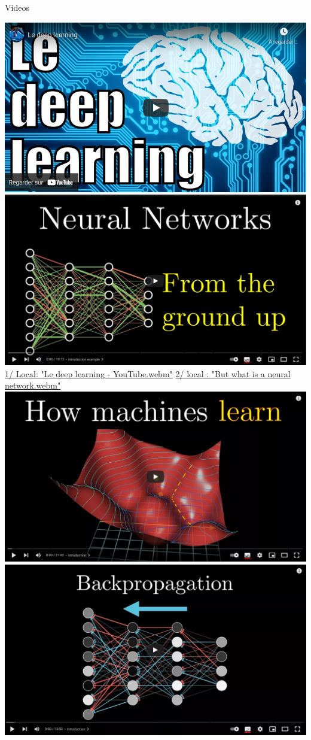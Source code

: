 \documentclass[11pt,serif,mathserif,compress,hyperref={colorlinks}]{beamer}
\begin{document}
\begin{frame}{Videos}

  \hspace*{-3mm}
  \href{https://youtu.be/trWrEWfhTVg}{\includegraphics[width=.5\textwidth]{images/video-LeDeepLearning.png}}
  \hfill%
  \href{https://www.3blue1brown.com/lessons/neural-networks}{\includegraphics[width=.5\textwidth]{images/video-NeuralNetworks.png}}\\[-2mm]

  {\tiny\hspace*{-2mm}\href{run:./videos/Le deep learning - YouTube.webm}{1/ Local: "Le deep learning - YouTube.webm"}%
    \hfill%
    \href{run:./videos/But what is a neural network.webm}{2/ local : "But what is a neural network.webm"}}\\[2mm]
            
  \hspace*{-3mm}
  \href{https://www.3blue1brown.com/lessons/gradient-descent}{\includegraphics[width=.5\textwidth]{images/video-HowMachineLearn.png}}
  \hfill
  \href{https://www.3blue1brown.com/lessons/backpropagation}{\includegraphics[width=.5\textwidth]{images/video-BackPropagation.png}}\\[-2mm]
  

\end{frame}
\end{document}
